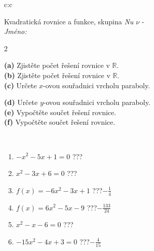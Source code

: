 \documentclass[10pt]{report}
\begin{document}
\begin{tabular}{c:c}
\begin{minipage}[c][104.5mm][t]{0.5\linewidth}
\begin{center}
\vspace{7mm}
{\huge \LARGE Kvadratická rovnice a funkce, skupina \textit{Nu $\nu$} -}\\[5mm]
\textit{Jméno:}\phantom{xxxxxxxxxxxxxxxxxxxxxxxxxxxxxxxxxxxxxxxxxxxxxxxxxxxxxxxxxxxxxxxxx}\\[5mm]
\begin{minipage}{0.95\linewidth}
\begin{center}
{\small \begin{multicols}{2} \raggedright
\textbf{(a)} Zjistěte počet řešení rovnice v \(\mathbb{R}\). \\[1mm]
\textbf{(b)} Zjistěte počet řešení rovnice v \(\mathbb{R}\). \\[1mm]
\textbf{(c)} Určete \(x\)-ovou souřadnici vrcholu paraboly. \par \columnbreak
\textbf{(d)} Určete \(y\)-ovou souřadnici vrcholu paraboly. \\[1mm]
\textbf{(e)} Vypočtěte součet řešení rovnice. \\[1mm]
\textbf{(f)} Vypočtěte součet řešení rovnice.
\end{multicols}
}
\end{center}
\end{minipage}
\\[4mm]
\begin{minipage}{0.79\linewidth}
\begin{center}
\begin{varwidth}{\linewidth}
\begin{enumerate}
\Large
\item $-x^2-5x+1=0$\quad \dotfill\; ???\;\dotfill {}
\item $x^2-3x+6=0$\quad \dotfill\; ???\;\dotfill {}
\item $f(x)=-6x^2-3x+1$\quad \dotfill\; ???\;\dotfill \quad $-\frac{1}{4}$
\item $f(x)=6x^2-5x-9$\quad \dotfill\; ???\;\dotfill \quad $-\frac{133}{24}$
\item $x^2-x-6=0$\quad \dotfill\; ???\;\dotfill {}
\item $-15x^2-4x+3=0$\quad \dotfill\; ???\;\dotfill \quad $-\frac{4}{15}$
\end{enumerate}
\end{varwidth}
\end{center}
\end{minipage}

\end{center}
\end{minipage}
\end{tabular}
\end{document}
